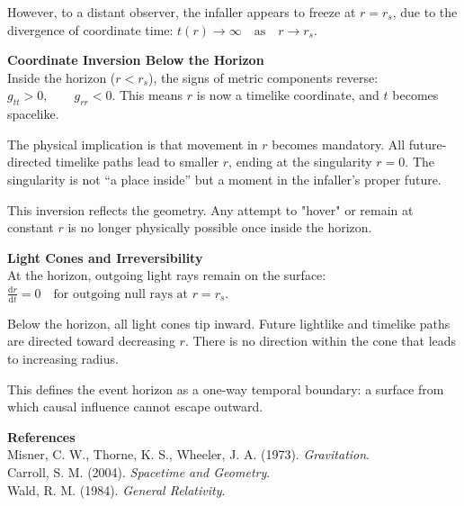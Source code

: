 \begin{technical}
However, to a distant observer, the infaller appears to freeze at \(r = r_s\), due to the divergence of coordinate time: $
t(r) \to \infty \quad \text{as} \quad r \to r_s$.

\vspace{0.3em}
\noindent\textbf{Coordinate Inversion Below the Horizon}\\[0.5em]
Inside the horizon (\(r < r_s\)), the signs of metric components reverse: $g_{tt} > 0, \qquad g_{rr} < 0$.
This means \(r\) is now a timelike coordinate, and \(t\) becomes spacelike.

The physical implication is that movement in \(r\) becomes mandatory. All future-directed timelike paths lead to smaller \(r\), ending at the singularity \(r = 0\). The singularity is not “a place inside” but a moment in the infaller’s proper future.

This inversion  reflects the geometry. Any attempt to "hover" or remain at constant \(r\) is no longer physically possible once inside the horizon.

\vspace{0.3em}
\noindent\textbf{Light Cones and Irreversibility}\\[0.5em]
At the horizon, outgoing light rays remain on the surface: $\frac{\mathrm{d}r}{\mathrm{d}t} = 0 \quad \text{for outgoing null rays at } r = r_s$.

Below the horizon, all light cones tip inward. Future lightlike and timelike paths are directed toward decreasing \(r\). There is no direction within the cone that leads to increasing radius.

This defines the event horizon as a one-way temporal boundary: a surface from which causal influence cannot escape outward.

\vspace{0.7em}
\noindent\textbf{References}\\
Misner, C. W., Thorne, K. S., Wheeler, J. A. (1973). \textit{Gravitation}.\\
Carroll, S. M. (2004). \textit{Spacetime and Geometry}.\\
Wald, R. M. (1984). \textit{General Relativity}.
\end{technical}

